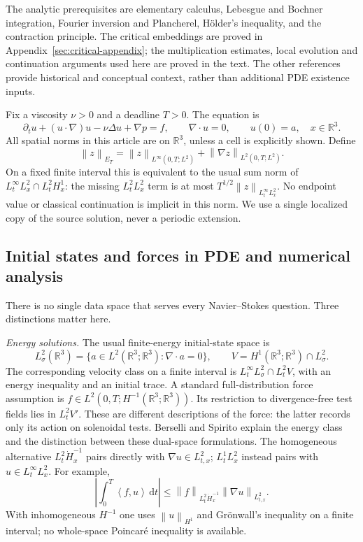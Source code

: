 \documentclass[11pt,a4paper]{article}
\theoremstyle{definition}\newtheorem{definition}[theorem]{Definition}
\theoremstyle{remark}\newtheorem{remark}[theorem]{Remark}
\newcommand{\R}{\mathbb R}\newcommand{\TT}{\mathbb T^3}
\newcommand{\dd}{\,\mathrm d}\newcommand{\eps}{\varepsilon}
\newcommand{\norm}[1]{\left\lVert#1\right\rVert}
\newcommand{\ip}[2]{\left\langle#1,#2\right\rangle}
\begin{document}
The analytic prerequisites are elementary calculus, Lebesgue and Bochner integration, Fourier inversion and Plancherel, H\"older's inequality, and the contraction principle. The critical embeddings are proved in Appendix~\ref{sec:critical-appendix}; the multiplication estimates, local evolution and continuation arguments used here are proved in the text. The other references provide historical and conceptual context, rather than additional PDE existence inputs.

Fix a viscosity $\nu>0$ and a deadline $T>0$. The equation is
\begin{equation}\label{eq:NS}
 \partial_tu+(u\cdot\nabla)u-\nu\Delta u+\nabla p=f,
 \qquad \nabla\cdot u=0,\qquad u(0)=a,
 \quad x\in\R^3.
\end{equation}
All spatial norms in this article are on $\R^3$, unless a cell is explicitly shown. Define
\begin{equation}\label{eq:Enorm}
 \norm{z}_{E_T}=\norm{z}_{L^\infty(0,T;L^2)}
                   +\norm{\nabla z}_{L^2(0,T;L^2)}.
\end{equation}
On a fixed finite interval this is equivalent to the usual sum norm of $L^\infty_tL^2_x\cap L^2_tH^1_x$: the missing $L^2_tL^2_x$ term is at most $T^{1/2}\norm{z}_{L^\infty_tL^2_x}$. No endpoint value or classical continuation is implicit in this norm. We use a single localized copy of the source solution, never a periodic extension.

\subsection{Initial states and forces in PDE and numerical analysis}
There is no single data space that serves every Navier--Stokes question. Three distinctions matter here.

\emph{Energy solutions.} The usual finite-energy initial-state space is
\[
 L^2_\sigma(\R^3)=\{a\in L^2(\R^3;\R^3):\nabla\cdot a=0\},
 \qquad V=H^1(\R^3;\R^3)\cap L^2_\sigma.
\]
The corresponding velocity class on a finite interval is $L^\infty_tL^2_\sigma\cap L^2_tV$, with an energy inequality and an initial trace. A standard full-distribution force assumption is $f\in L^2(0,T;H^{-1}(\R^3;\R^3))$. Its restriction to divergence-free test fields lies in $L^2_tV'$. These are different descriptions of the force: the latter records only its action on solenoidal tests. Berselli and Spirito \cite[Definition 1 and Remark 4]{berselli} explain the energy class and the distinction between these dual-space formulations. The homogeneous alternative $L^2_t\dot H^{-1}_x$ pairs directly with $\nabla u\in L^2_{t,x}$; $L^1_tL^2_x$ instead pairs with $u\in L^\infty_tL^2_x$. For example,
\[
 \left|\int_0^T\!\ip{f}{u}\dd t\right|
 \le \norm{f}_{L^2_t\dot H^{-1}_x}\norm{\nabla u}_{L^2_{t,x}}.
\]
With inhomogeneous $H^{-1}$ one uses $\norm{u}_{H^1}$ and Gr\"onwall's inequality on a finite interval; no whole-space Poincar\'e inequality is available.
\end{document}

